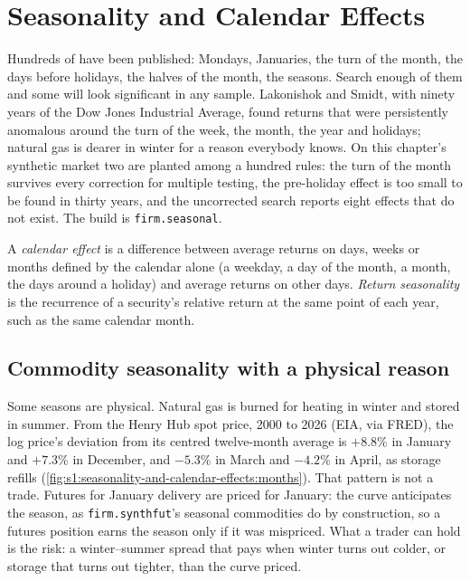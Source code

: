 \chapter{Seasonality and Calendar Effects}\label{ch:s1:seasonality-and-calendar-effects}

Hundreds of  have been published: Mondays, Januaries, the turn of the month, the days before holidays, the halves of the month, the
seasons. Search enough of them and some will look significant in any sample. Lakonishok and Smidt, with ninety years of the Dow Jones Industrial
Average, found returns that were persistently anomalous around the turn of the week, the month, the year and holidays; natural gas is dearer in winter
for a reason everybody knows. On this chapter's synthetic market two  are planted among a hundred rules: the turn of the month survives
every correction for multiple testing, the pre-holiday effect is too small to be found in thirty years, and the uncorrected search reports eight
effects that do not exist. The build is \texttt{firm.seasonal}.

\begin{definition}\label{def:s1:seasonality-and-calendar-effects:calendar}
A \emph{calendar effect} is a difference between average returns on days, weeks or months defined by the calendar alone (a
weekday, a day of the month, a month, the days around a holiday) and average returns on other days. \emph{Return seasonality} is the recurrence of a security's relative return at the same point of each year, such as the same calendar month.
\end{definition}

\section{Commodity seasonality with a physical reason}

Some seasons are physical. Natural gas is burned for heating in winter and stored in summer. From the Henry Hub spot price, 2000 to 2026 (EIA, via
FRED), the log price's deviation from its centred twelve-month average is $+8.8\%$ in January and $+7.3\%$ in December, and $-5.3\%$ in March and
$-4.2\%$ in April, as storage refills (\cref{fig:s1:seasonality-and-calendar-effects:months}). That pattern is not a trade. Futures for January delivery
are priced for January: the curve anticipates the season, as \texttt{firm.synthfut}'s seasonal commodities do by construction, so a futures position
earns the season only if it was mispriced. What a trader can hold is the risk: a winter--summer spread that pays when winter turns out colder, or
storage that turns out tighter, than the curve priced.

